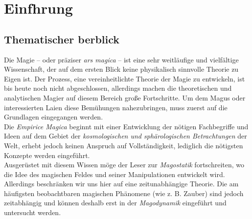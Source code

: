 \chapter[tocentry=Einführung, head=Einführung]{Einf\uech hrung}
\section[tocentry=Thematischer Überblick, head=Thematischer Überblick]{Thematischer \Uese berblick}
Die Magie -- oder präziser \emph{ars magica} -- ist eine sehr weitläufige und vielfältige Wissenschaft, der auf dem ersten Blick keine physikalisch sinnvolle Theorie zu Eigen ist. Der Prozess, eine vereinheitlichte Theorie der Magie zu entwickeln, ist bis heute noch nicht abgeschlossen, allerdings machen die theoretischen und analytischen Magier auf diesem Bereich große Fortschritte. Um dem Magus oder interessierten Laien diese Bemühungen nahezubringen, muss zuerst auf die Grundlagen eingegangen werden. \\
Die \emph{Empirice Magica} beginnt mit einer Entwicklung der nötigen Fachbegriffe und Ideen auf dem Gebiet der \emph{kosmologischen und sphärologischen Betrachtungen} der Welt, erhebt jedoch keinen Anspruch auf Vollständigkeit, lediglich die nötigsten Konzepte werden eingeführt.\\
Ausgerüstet mit diesem Wissen möge der Leser zur \emph{Magostatik} fortschreiten, wo die Idee des magischen Feldes und seiner Manipulationen entwickelt wird. Allerdings beschränken wir uns hier auf eine zeitunabhängige Theorie.
Die am häufigsten beobachtbaren magischen Phänomene (wie z. B. Zauber) sind jedoch zeitabhängig und können deshalb erst in der \emph{Magodynamik} eingeführt und untersucht werden.
